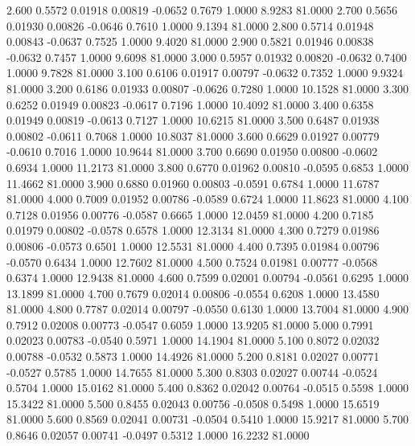    2.600   0.5572   0.01918   0.00819  -0.0652   0.7679   1.0000   8.9283  81.0000
   2.700   0.5656   0.01930   0.00826  -0.0646   0.7610   1.0000   9.1394  81.0000
   2.800   0.5714   0.01948   0.00843  -0.0637   0.7525   1.0000   9.4020  81.0000
   2.900   0.5821   0.01946   0.00838  -0.0632   0.7457   1.0000   9.6098  81.0000
   3.000   0.5957   0.01932   0.00820  -0.0632   0.7400   1.0000   9.7828  81.0000
   3.100   0.6106   0.01917   0.00797  -0.0632   0.7352   1.0000   9.9324  81.0000
   3.200   0.6186   0.01933   0.00807  -0.0626   0.7280   1.0000  10.1528  81.0000
   3.300   0.6252   0.01949   0.00823  -0.0617   0.7196   1.0000  10.4092  81.0000
   3.400   0.6358   0.01949   0.00819  -0.0613   0.7127   1.0000  10.6215  81.0000
   3.500   0.6487   0.01938   0.00802  -0.0611   0.7068   1.0000  10.8037  81.0000
   3.600   0.6629   0.01927   0.00779  -0.0610   0.7016   1.0000  10.9644  81.0000
   3.700   0.6690   0.01950   0.00800  -0.0602   0.6934   1.0000  11.2173  81.0000
   3.800   0.6770   0.01962   0.00810  -0.0595   0.6853   1.0000  11.4662  81.0000
   3.900   0.6880   0.01960   0.00803  -0.0591   0.6784   1.0000  11.6787  81.0000
   4.000   0.7009   0.01952   0.00786  -0.0589   0.6724   1.0000  11.8623  81.0000
   4.100   0.7128   0.01956   0.00776  -0.0587   0.6665   1.0000  12.0459  81.0000
   4.200   0.7185   0.01979   0.00802  -0.0578   0.6578   1.0000  12.3134  81.0000
   4.300   0.7279   0.01986   0.00806  -0.0573   0.6501   1.0000  12.5531  81.0000
   4.400   0.7395   0.01984   0.00796  -0.0570   0.6434   1.0000  12.7602  81.0000
   4.500   0.7524   0.01981   0.00777  -0.0568   0.6374   1.0000  12.9438  81.0000
   4.600   0.7599   0.02001   0.00794  -0.0561   0.6295   1.0000  13.1899  81.0000
   4.700   0.7679   0.02014   0.00806  -0.0554   0.6208   1.0000  13.4580  81.0000
   4.800   0.7787   0.02014   0.00797  -0.0550   0.6130   1.0000  13.7004  81.0000
   4.900   0.7912   0.02008   0.00773  -0.0547   0.6059   1.0000  13.9205  81.0000
   5.000   0.7991   0.02023   0.00783  -0.0540   0.5971   1.0000  14.1904  81.0000
   5.100   0.8072   0.02032   0.00788  -0.0532   0.5873   1.0000  14.4926  81.0000
   5.200   0.8181   0.02027   0.00771  -0.0527   0.5785   1.0000  14.7655  81.0000
   5.300   0.8303   0.02027   0.00744  -0.0524   0.5704   1.0000  15.0162  81.0000
   5.400   0.8362   0.02042   0.00764  -0.0515   0.5598   1.0000  15.3422  81.0000
   5.500   0.8455   0.02043   0.00756  -0.0508   0.5498   1.0000  15.6519  81.0000
   5.600   0.8569   0.02041   0.00731  -0.0504   0.5410   1.0000  15.9217  81.0000
   5.700   0.8646   0.02057   0.00741  -0.0497   0.5312   1.0000  16.2232  81.0000
